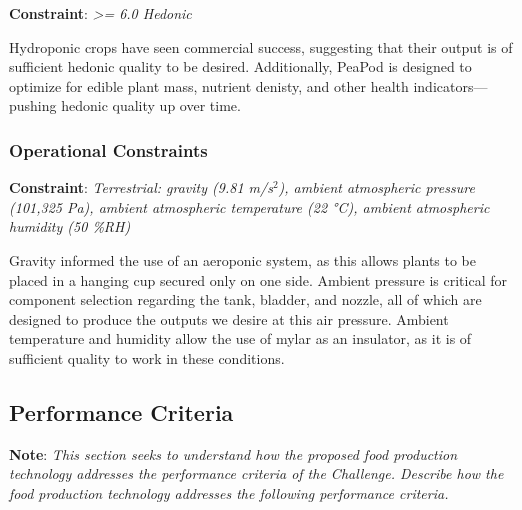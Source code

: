 \documentclass{report}
\begin{document}
\textbf{Constraint}: \textit{>= 6.0 Hedonic}


Hydroponic crops have seen commercial success, suggesting that their output is of sufficient hedonic quality to be desired. Additionally, PeaPod is designed to optimize for edible plant mass, nutrient denisty, and other health indicators---pushing hedonic quality up over time.

\subsubsection{Operational Constraints} 
\label{sec:constraints-operational}

\textbf{Constraint}: \textit{Terrestrial: gravity (9.81 m/s${}^2$), ambient atmospheric pressure (101,325 Pa), ambient atmospheric temperature (22 °C), ambient atmospheric humidity (50 \%RH)}


Gravity informed the use of an aeroponic system, as this allows plants to be placed in a hanging cup secured only on one side. Ambient pressure is critical for component selection regarding the tank, bladder, and nozzle, all of which are designed to produce the outputs we desire at this air pressure. Ambient temperature and humidity allow the use of mylar as an insulator, as it is of sufficient quality to work in these conditions.



\subsection{Performance Criteria}

\textbf{Note}: \textit{This section seeks to understand how the proposed food production technology addresses the performance criteria of the Challenge. Describe how the food production technology addresses the following performance criteria.}
\end{document}

